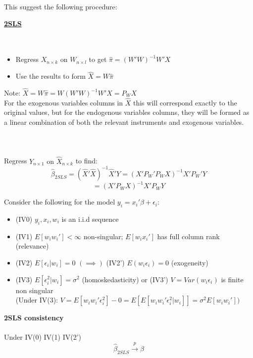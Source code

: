 \documentclass[DIV=14,titlepage=false]{scrreprt}
\begin{document}
This suggest the following procedure:

\begin{definition} \textbf{\underline{2SLS}}
    \\
    \\ \underline{} \\
    \begin{itemize}
    \item Regress \(X_{n\times k} \text{ on } W_{n\times l}\) to get \(\hat\pi=(W'W)^{-1}W'X\)
    \item Use the results to form \(\hat X = W\hat\pi\) \\
    \end{itemize}
    Note: \(\hat X=W\hat\pi=W(W'W)^{-1}W'X=P_W X\)
    \\ For the exogenous variables columns in \(\hat X\) this will correspond exactly to the original values, but for the endogenous variables columns, they will be formed as a linear combination of both the relevant instruments and exogenous variables.
    \\ \\ \underline{} \\
    \\ Regress \(Y_{n\times 1} \text{ on } \hat X_{n\times k}\) to find:
     \[\hat\beta_{2SLS}=(\hat X'\hat X)^{-1}\hat X'Y=(X'P_W'P_WX)^{-1}X'P_W'Y\]
     \[=(X'P_WX)^{-1}X'P_WY\]
\end{definition}
\vspace{5mm}
Consider the following \textbf{\underline{}} for the model \(y_i=x_i'\beta+\epsilon_i\):
\begin{itemize}
    \item (IV0) \(y_i, x_i, w_i\) is an i.i.d sequence
    \item (IV1) \(E[w_iw_i']<\infty\) non-singular; \(E[w_ix_i']\) has full column rank (relevance)
    \item (IV2) \(E[\epsilon_i|w_i]=0\) \((\implies)\) (IV2') \(E(w_i\epsilon_i)=0\) (exogeneity)
    \item (IV3) \(E[\epsilon_i^2|w_i]=\sigma^2\) (homoskedasticity) or (IV3') \(V=Var(w_i\epsilon_i)\) is finite non singular
    \\ (Under IV(3): \(V=E[w_iw_i'\epsilon_i^2]-0=E[E[w_iw_i'\epsilon_i^2|w_i]]=\sigma^2E[w_iw_i'])\)
\end{itemize}
\vspace{5mm}
\begin{theorem} \textbf{2SLS consistency}
    \\ \
    \\ Under IV(0) IV(1) IV(2')
    \[\hat\beta_{2SLS}\xrightarrow{p}\beta\]
\end{theorem}
\end{document}
